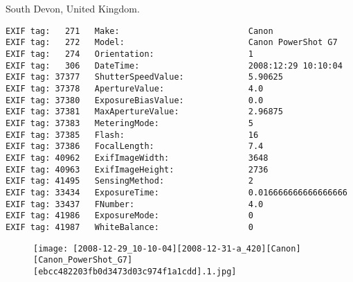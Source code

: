 \section{\protect{}}
\noindent South Devon, United Kingdom.
\noindent
\begin{lstlisting}
EXIF tag:   271   Make:                          Canon
EXIF tag:   272   Model:                         Canon PowerShot G7
EXIF tag:   274   Orientation:                   1
EXIF tag:   306   DateTime:                      2008:12:29 10:10:04
EXIF tag: 37377   ShutterSpeedValue:             5.90625
EXIF tag: 37378   ApertureValue:                 4.0
EXIF tag: 37380   ExposureBiasValue:             0.0
EXIF tag: 37381   MaxApertureValue:              2.96875
EXIF tag: 37383   MeteringMode:                  5
EXIF tag: 37385   Flash:                         16
EXIF tag: 37386   FocalLength:                   7.4
EXIF tag: 40962   ExifImageWidth:                3648
EXIF tag: 40963   ExifImageHeight:               2736
EXIF tag: 41495   SensingMethod:                 2
EXIF tag: 33434   ExposureTime:                  0.016666666666666666
EXIF tag: 33437   FNumber:                       4.0
EXIF tag: 41986   ExposureMode:                  0
EXIF tag: 41987   WhiteBalance:                  0

\end{lstlisting}
\clearpage
\begin{figure}
\raggedleft
\texttt{[image: [2008-12-29\_10-10-04][2008-12-31-a\_420][Canon][Canon\_PowerShot\_G7][ebcc482203fb0d3473d03c974f1a1cdd].1.jpg]}
\end{figure}


\clearpage
